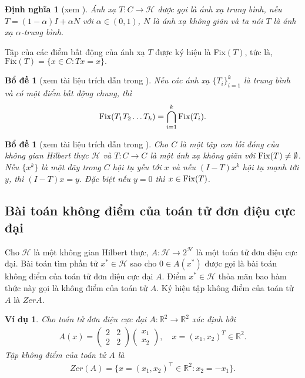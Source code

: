 \documentclass[14pt, oneside,A4paper]{book}
\theoremstyle{plain}
\newtheorem{bd}[theorem]{Bổ đề}
\newtheorem{vd}[theorem]{\bf Ví dụ}
\newtheorem{dn}[theorem]{\bf Định nghĩa}
\begin{document}
\begin{dn}[xem \cite{BHN}]\rm Ánh xạ $T:C\to \mathcal H$ được gọi là ánh xạ trung bình, nếu $T=(1-\alpha)I + \alpha N $ với $\alpha \in (0,1)$, $N$ là ánh xạ không giãn và ta nói $T$ là ánh xạ $\alpha$-trung bình.
\end{dn}

Tập của các điểm bất động của ánh xạ $T$ được ký hiệu là Fix$(T)$, tức là, $\text{Fix}(T)=\lbrace x \in C:Tx = x\rbrace.$
\begin{bd}[xem tài liệu trích dẫn trong \cite{BHN}] \label{bd2.2.5}
	Nếu các ánh xạ $\lbrace T_{i} \rbrace _{i=1}^{k}$ là trung bình và có một điểm bất động chung, thì
	\begin{align*}
	\text{\rm Fix}(T_{1}T_{2}\dots T_{k})=\bigcap_{i=1}^{k} \text{\rm Fix}(T_{i}).
	\end{align*}
\end{bd}
\begin{bd}[xem tài liệu trích dẫn trong \cite{BHN}] \label{bd2.2.6}
	Cho $C$ là một tập con lồi đóng của không gian Hilbert thực $\mathcal H$ và $T:C \rightarrow C$ là một ánh xạ không giãn với $\text{\rm Fix}(T)\neq \emptyset$. Nếu $\lbrace x^{k} \rbrace$ là một dãy trong $C$ hội tụ yếu tới $x$ và nếu $(I-T)x^{k}$ hội tụ mạnh tới $y$, thì $(I-T)x=y$. Đặc biệt nếu $y=0$ thì $x \in \text{\rm Fix}(T)$.
\end{bd}

\subsection{Bài toán không điểm của toán tử đơn điệu cực đại}

Cho $\mathcal H$ là một không gian Hilbert thực, $A: \mathcal H\to 2^{\mathcal H}$ là một toán tử đơn điệu cực đại. Bài toán tìm phần tử $x^*\in \mathcal H$ sao cho $0\in A(x^*)$ được gọi là bài toán không điểm của toán tử đơn điệu cực đại $A$. Điểm $x^*\in \mathcal H$ thỏa mãn bao hàm thức này gọi là không điểm của toán tử $A$. Ký hiệu tập không điểm của toán tử $A$ là $Zer A$.

\begin{vd} \rm Cho toán tử đơn điệu cực đại $A:\mathbb R^{2} \rightarrow \mathbb R^{2}$ xác định bởi
	\begin{align*}
	A(x)= \begin{pmatrix}
	2 & 2\\ 
	2 & 2
	\end{pmatrix}
	\begin{pmatrix}
	x_{1}\\x_{2} 
	\end{pmatrix}, \quad x=(x_{1},x_{2})^{T} \in \mathbb R^{2}.
	\end{align*}
Tập không điểm của toán tử $A$ là
\begin{align*}
Zer(A) = \lbrace x=(x_{1},x_{2})^{\top} \in \mathbb R^{2}:x_{2} = -x_{1} \rbrace.
\end{align*}
\end{vd}
\end{document}
